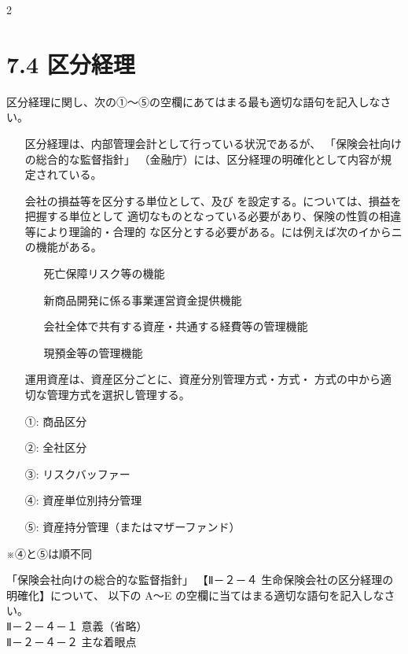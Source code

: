 2\documentclass[report,gutter=10mm,fore-edge=10mm,uplatex,dvipdfmx]{jlreq}
\begin{document}
\section{7.4 区分経理}
区分経理に関し、次の①～⑤の空欄にあてはまる最も適切な語句を記入しなさい。

\begin{itemize}
 \item[] 区分経理は、内部管理会計として行っている状況であるが、
 「保険会社向けの総合的な監督指針」
 （金融庁）には、区分経理の明確化として内容が規定されている。
 \item[] 会社の損益等を区分する単位として、及び
 を設定する。については、損益を把握する単位として
 適切なものとなっている必要があり、保険の性質の相違等により理論的・合理的
 な区分とする必要がある。には例えば次のイからニの機能がある。
\begin{itemize}
\item[] 死亡保障リスク等の機能
\item[] 新商品開発に係る事業運営資金提供機能
\item[] 会社全体で共有する資産・共通する経費等の管理機能
\item[] 現預金等の管理機能
\end{itemize} 
\item[] 運用資産は、資産区分ごとに、資産分別管理方式・方式・
 方式の中から適切な管理方式を選択し管理する。
\end{itemize}

\answer{}
\begin{itemize}
\item[ ①: ] 商品区分
\item[ ②: ] 全社区分
\item[ ③: ] リスクバッファー
\item[ ④: ] 資産単位別持分管理
\item[ ⑤: ] 資産持分管理（またはマザーファンド）
\end{itemize}

※④と⑤は順不同

「保険会社向けの総合的な監督指針」
【Ⅱ－２－４ 生命保険会社の区分経理の明確化】について、
以下の A～E の空欄に当てはまる適切な語句を記入しなさい。\\
\vspace{1zh}
\noindent Ⅱ－２－４－１ 意義（省略）\\
Ⅱ－２－４－２ 主な着眼点
\end{document}

